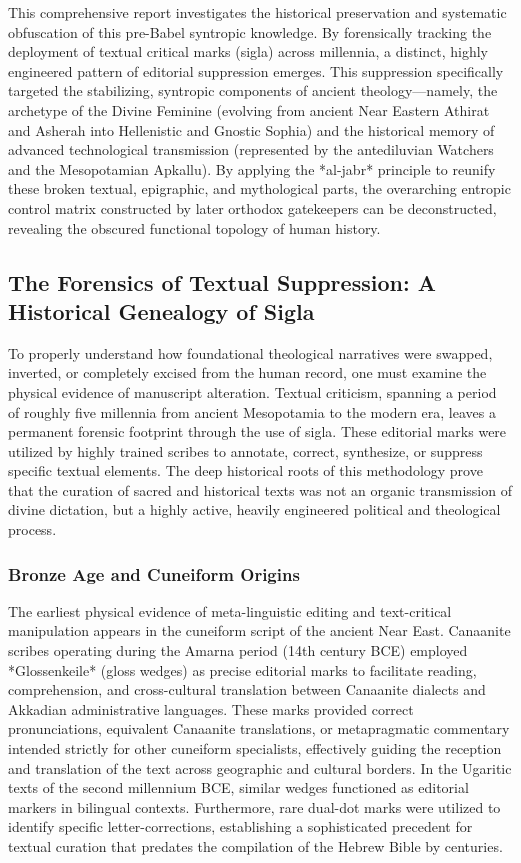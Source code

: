 \documentclass[aps,prd,11pt,onecolumn,superscriptaddress,nofootinbib,floatfix]{revtex4-2}
\begin{document}
This comprehensive report investigates the historical preservation and systematic obfuscation of this pre-Babel syntropic knowledge. By forensically tracking the deployment of textual critical marks (sigla) across millennia, a distinct, highly engineered pattern of editorial suppression emerges. This suppression specifically targeted the stabilizing, syntropic components of ancient theology---namely, the archetype of the Divine Feminine (evolving from ancient Near Eastern Athirat and Asherah into Hellenistic and Gnostic Sophia) and the historical memory of advanced technological transmission (represented by the antediluvian Watchers and the Mesopotamian Apkallu). By applying the *al-jabr* principle to reunify these broken textual, epigraphic, and mythological parts, the overarching entropic control matrix constructed by later orthodox gatekeepers can be deconstructed, revealing the obscured functional topology of human history.


\subsection{The Forensics of Textual Suppression: A Historical Genealogy of Sigla}
To properly understand how foundational theological narratives were swapped, inverted, or completely excised from the human record, one must examine the physical evidence of manuscript alteration. Textual criticism, spanning a period of roughly five millennia from ancient Mesopotamia to the modern era, leaves a permanent forensic footprint through the use of sigla. These editorial marks were utilized by highly trained scribes to annotate, correct, synthesize, or suppress specific textual elements. The deep historical roots of this methodology prove that the curation of sacred and historical texts was not an organic transmission of divine dictation, but a highly active, heavily engineered political and theological process.


\subsubsection{Bronze Age and Cuneiform Origins}
The earliest physical evidence of meta-linguistic editing and text-critical manipulation appears in the cuneiform script of the ancient Near East. Canaanite scribes operating during the Amarna period (14th century BCE) employed *Glossenkeile* (gloss wedges) as precise editorial marks to facilitate reading, comprehension, and cross-cultural translation between Canaanite dialects and Akkadian administrative languages. These marks provided correct pronunciations, equivalent Canaanite translations, or metapragmatic commentary intended strictly for other cuneiform specialists, effectively guiding the reception and translation of the text across geographic and cultural borders. In the Ugaritic texts of the second millennium BCE, similar wedges functioned as editorial markers in bilingual contexts. Furthermore, rare dual-dot marks were utilized to identify specific letter-corrections, establishing a sophisticated precedent for textual curation that predates the compilation of the Hebrew Bible by centuries.
\end{document}
